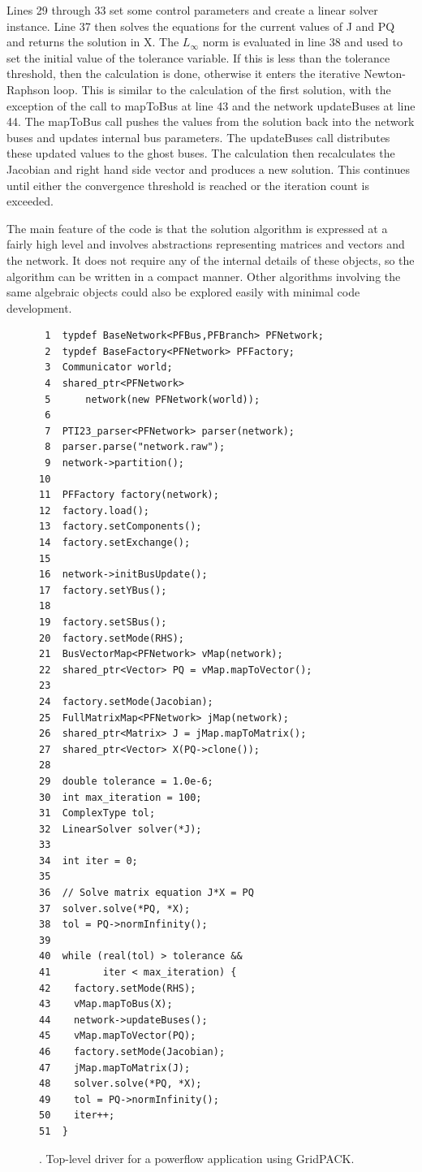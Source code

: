 \documentclass[preprint]{acm_proc_article-sp}
\begin{document}
Lines 29 through 33 set some control parameters and create a linear solver
instance. Line 37 then solves the equations for the current values of J and PQ
and returns the solution in X. The $L_{\infty}$ norm is evaluated in line 38 and
used
to set the initial value of the tolerance variable. If this is less than the
tolerance threshold, then the calculation is done, otherwise it enters the
iterative Newton-Raphson loop. This is similar to the calculation of the first
solution, with the exception of the call to mapToBus at line 43 and the network
updateBuses at line 44. The mapToBus call pushes the values from the solution back
into the network buses and updates internal bus parameters. The updateBuses call
distributes these updated values to the ghost buses. The calculation then
recalculates the Jacobian and right hand side vector and produces a new
solution. This continues until either the convergence threshold is reached or
the iteration count is exceeded.

The main feature of the code is that the solution algorithm is expressed at a
fairly high level and involves abstractions representing matrices and vectors
and the network. It does not require any of the internal details of these
objects, so the algorithm can be written in a compact manner. Other algorithms
involving the same algebraic objects could also be explored easily with minimal
code development.

\begin{figure}
\label{code}
\begin{verbatim}
 1  typdef BaseNetwork<PFBus,PFBranch> PFNetwork;
 2  typdef BaseFactory<PFNetwork> PFFactory;
 3  Communicator world;
 4  shared_ptr<PFNetwork>
 5      network(new PFNetwork(world));
 6
 7  PTI23_parser<PFNetwork> parser(network);
 8  parser.parse("network.raw");
 9  network->partition();
10
11  PFFactory factory(network);
12  factory.load();
13  factory.setComponents();
14  factory.setExchange();
15
16  network->initBusUpdate();
17  factory.setYBus();
18
19  factory.setSBus();
20  factory.setMode(RHS); 
21  BusVectorMap<PFNetwork> vMap(network);
22  shared_ptr<Vector> PQ = vMap.mapToVector();
23
24  factory.setMode(Jacobian);
25  FullMatrixMap<PFNetwork> jMap(network);
26  shared_ptr<Matrix> J = jMap.mapToMatrix();
27  shared_ptr<Vector> X(PQ->clone());
28
29  double tolerance = 1.0e-6;
30  int max_iteration = 100;
31  ComplexType tol;
32  LinearSolver solver(*J);
33
34  int iter = 0;
35
36  // Solve matrix equation J*X = PQ
37  solver.solve(*PQ, *X);
38  tol = PQ->normInfinity();
39
40  while (real(tol) > tolerance &&
41         iter < max_iteration) {
42    factory.setMode(RHS);
43    vMap.mapToBus(X);
44    network->updateBuses();
45    vMap.mapToVector(PQ);
46    factory.setMode(Jacobian);
47    jMap.mapToMatrix(J);
48    solver.solve(*PQ, *X);
49    tol = PQ->normInfinity();
50    iter++;
51  }
\end{verbatim}
\caption{\label{pf_app}. Top-level driver for a powerflow application using
GridPACK\texttrademark.}
\end{figure}
\end{document}
